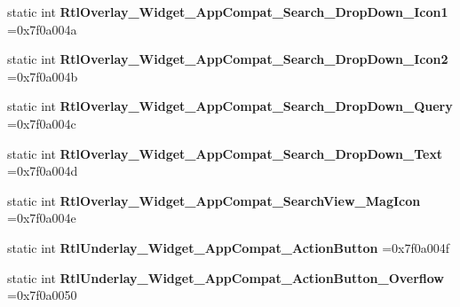 \begin{DoxyCompactItemize}
static int {\bfseries Rtl\+Overlay\+\_\+\+Widget\+\_\+\+App\+Compat\+\_\+\+Search\+\_\+\+Drop\+Down\+\_\+\+Icon1} =0x7f0a004a
\item 
\mbox{\label{classandroid_1_1support_1_1v7_1_1appcompat_1_1R_1_1style_a13bc0c6b576fbe9ed838f7886b292296}} 
static int {\bfseries Rtl\+Overlay\+\_\+\+Widget\+\_\+\+App\+Compat\+\_\+\+Search\+\_\+\+Drop\+Down\+\_\+\+Icon2} =0x7f0a004b
\item 
\mbox{\label{classandroid_1_1support_1_1v7_1_1appcompat_1_1R_1_1style_a05103f6931786e350aee46fc68d777b7}} 
static int {\bfseries Rtl\+Overlay\+\_\+\+Widget\+\_\+\+App\+Compat\+\_\+\+Search\+\_\+\+Drop\+Down\+\_\+\+Query} =0x7f0a004c
\item 
\mbox{\label{classandroid_1_1support_1_1v7_1_1appcompat_1_1R_1_1style_a94bbb0761cecb48bd3939f996091a91f}} 
static int {\bfseries Rtl\+Overlay\+\_\+\+Widget\+\_\+\+App\+Compat\+\_\+\+Search\+\_\+\+Drop\+Down\+\_\+\+Text} =0x7f0a004d
\item 
\mbox{\label{classandroid_1_1support_1_1v7_1_1appcompat_1_1R_1_1style_a9c03f05666dce3cb99688d14af2dc079}} 
static int {\bfseries Rtl\+Overlay\+\_\+\+Widget\+\_\+\+App\+Compat\+\_\+\+Search\+View\+\_\+\+Mag\+Icon} =0x7f0a004e
\item 
\mbox{\label{classandroid_1_1support_1_1v7_1_1appcompat_1_1R_1_1style_ac74d18c16cff61d0bc4b2de2e5e7a217}} 
static int {\bfseries Rtl\+Underlay\+\_\+\+Widget\+\_\+\+App\+Compat\+\_\+\+Action\+Button} =0x7f0a004f
\item 
\mbox{\label{classandroid_1_1support_1_1v7_1_1appcompat_1_1R_1_1style_ac34683194f6d6104499c63d5a06a7df2}} 
static int {\bfseries Rtl\+Underlay\+\_\+\+Widget\+\_\+\+App\+Compat\+\_\+\+Action\+Button\+\_\+\+Overflow} =0x7f0a0050
\item 
\mbox{\label{classandroid_1_1support_1_1v7_1_1appcompat_1_1R_1_1style_a872c8e292a233c897bbd46de52f3a978}} 

\end{DoxyCompactItemize}
